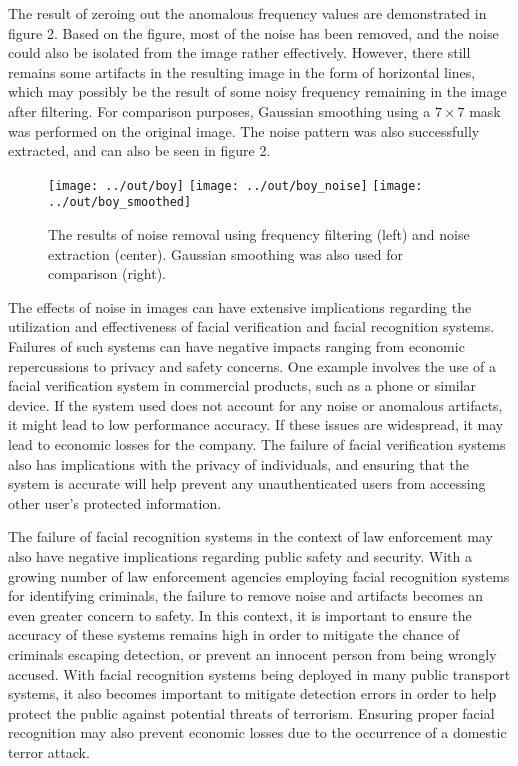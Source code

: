 \documentclass[headings=optiontoheadandtoc,listof=totoc,parskip=full]{scrartcl}
\begin{document}
The result of zeroing out the anomalous frequency values are demonstrated in figure 2. Based on the figure, most of the noise has been removed, and the noise could also be isolated from the image rather effectively. However, there still remains some artifacts in the resulting image in the form of horizontal lines, which may possibly be the result of some noisy frequency remaining in the image after filtering. For comparison purposes, Gaussian smoothing using a $7 \times 7$ mask was performed on the original image. The noise pattern was also successfully extracted, and can also be seen in figure 2.

\begin{figure}[H]
	\centering
	\texttt{[image: ../out/boy]}
	\texttt{[image: ../out/boy\_noise]}
	\texttt{[image: ../out/boy\_smoothed]}
	\caption{The results of noise removal using frequency filtering (left) and noise extraction (center). Gaussian smoothing was also used for comparison (right).}
	\label{fig:boy}
\end{figure}

The effects of noise in images can have extensive implications regarding the utilization and effectiveness of facial verification and facial recognition systems. Failures of such systems can have negative impacts ranging from economic repercussions to privacy and safety concerns. One example involves the use of a facial verification system in commercial products, such as a phone or similar device. If the system used does not account for any noise or anomalous artifacts, it might lead to low performance accuracy. If these issues are widespread, it may lead to economic losses for the company. The failure of facial verification systems also has implications with the privacy of individuals, and ensuring that the system is accurate will help prevent any unauthenticated users from accessing other user’s protected information.

The failure of facial recognition systems in the context of law enforcement may also have negative implications regarding public safety and security. With a growing number of law enforcement agencies employing facial recognition systems for identifying criminals, the failure to remove noise and artifacts becomes an even greater concern to safety. In this context, it is important to ensure the accuracy of these systems remains high in order to mitigate the chance of criminals escaping detection, or prevent an innocent person from being wrongly accused. With facial recognition systems being deployed in many public transport systems, it also becomes important to mitigate detection errors in order to help protect the public against potential threats of terrorism. Ensuring proper facial recognition may also prevent economic losses due to the occurrence of a domestic terror attack.
\end{document}
